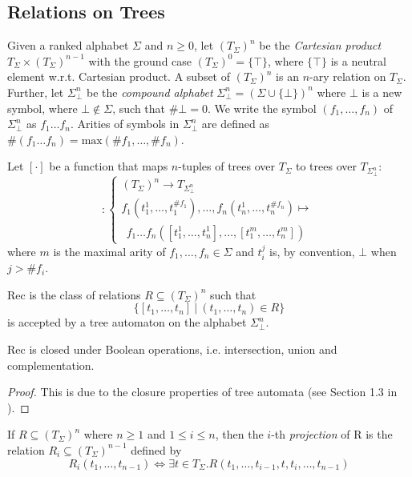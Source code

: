  \subsection{Relations on Trees}

Given a ranked alphabet $\Sigma$ and $n \geq 0$, let $(T_\Sigma)^n$ be the \emph{Cartesian product} $T_\Sigma \times (T_\Sigma)^{n-1}$ with the ground case $(T_\Sigma)^0 = \{\top\}$, where $\{\top\}$ is a neutral element w.r.t. Cartesian product. A subset of $(T_\Sigma)^n$ is an $n$-ary relation on $T_\Sigma$. Further, let $\Sigma^n_\bot$ be the \emph{compound alphabet} $\Sigma_\bot^n = (\Sigma \cup \{\bot\})^n$ where $\bot$ is a new symbol, where $\bot \notin \Sigma$, such that $\#\bot = 0$. We write the symbol $(f_1,\ldots,f_n)$ of $\Sigma_\bot^n$ as $f_1\ldots f_n$. Arities of symbols in $\Sigma_\bot^n$ are defined as $\#(f_1\ldots f_n) = \text{max}(\#f_1,\ldots,\#f_n)$.

Let $[\cdot]$ be a function that maps $n$-tuples of trees over $T_\Sigma$ to trees over $T_{\Sigma_\bot^n}$:
\begin{equation}
    [\cdot] :
    \begin{cases}
     (T_\Sigma)^n \rightarrow T_{\Sigma^n_\bot}\\
		 f_1(t_1^1,\ldots,t^{\#f_1}_1),\ldots,f_n(t_n^1,\ldots,t^{\#f_n}_n) \mapsto\\
		 \ \ f_1\ldots f_n([t_1^1,\ldots,t_n^1],\ldots,[t_1^m,\ldots,t_n^m])
   \end{cases}
\end{equation}
 where $m$ is the maximal arity of $f_1,\ldots,f_n \in \Sigma$ and $t_i^j$ is, by convention, $\bot$ when $j > \#f_i$.

\begin{defz}
Rec is the class of relations $R \subseteq (T_\Sigma)^n$ such that $$\{[t_1,\ldots,t_n]\ |\ (t_1,\ldots,t_n) \in R\}$$ is accepted by a tree automaton on the alphabet $\Sigma_\bot^n$.
\end{defz}

\begin{prop}
Rec is closed under Boolean operations, i.e. intersection, union and complementation.
\end{prop}

\begin{proof}
This is due to the closure properties of tree automata (see Section 1.3 in \cite{tata}).
\end{proof}

\begin{defz}
If $R \subseteq (T_\Sigma)^n$ where $n \geq 1$ and $1 \leq i \leq n$, then the $i$-th \emph{projection} of R is the relation $R_i \subseteq (T_\Sigma)^{n-1}$ defined by $$ R_i(t_1,\ldots,t_{n-1}) \Leftrightarrow \exists t \in T_\Sigma . R(t_1,\ldots,t_{i-1},t,t_i,\ldots,t_{n-1})$$
\end{defz}


